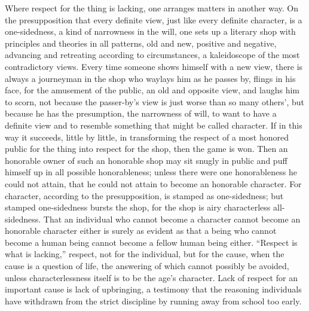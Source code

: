 \documentclass[12pt,a4paper,openany]{book}
\newcommand{\opage}[1]{\marginnote{\footnotesize\textit{[#1]}}}
\begin{document}
Where respect for the thing is lacking, one arranges matters
in another way. On the presupposition that every
definite view, just like every definite character,
is a one-sidedness, a kind of narrowness in the will,
one sets up a literary shop with principles and
theories in all patterns, old and new, positive and negative,
advancing and retreating according to circumstances, a kaleidoscope
of the most contradictory views. Every time
someone shows himself with a new view, there is always a
journeyman in the shop who waylays him as he passes by,
flings in his face, for the amusement of the public, an old and
opposite view, and laughs him to scorn, not
because the passer-by's view is just worse than
so many others', but because he has the presumption,
the narrowness of will, to want to have a definite view
and to resemble something that might be called character.
If in this way it succeeds, little by little, in transforming
the respect of a most honored public for the thing into respect
for the shop, then the game is won. Then an
honorable owner of such an honorable shop may sit snugly
in public and puff himself up in all possible honorableness;
unless there were one honorableness
he could not attain, that he could not attain to become
an
\setcounter{footnote}{0}%
\opage{416}honorable character. For character, according to the presupposition,
is stamped as one-sidedness; but stamped one-sidedness
bursts the shop, for the shop is airy
characterless all-sidedness. That an individual who cannot
become a character cannot become an honorable character either
is surely as evident as that a being who
cannot become a human being cannot become a fellow human being either.
``Respect is what is lacking,'' respect,
not for the individual, but for the cause, when the cause is a
question of life, the answering of which cannot possibly be avoided,
unless characterlessness itself is to be the age's
character. Lack of respect for an important cause
is lack of upbringing, a testimony that the
reasoning individuals have withdrawn from the strict
discipline by running away from school too early.
\end{document}
